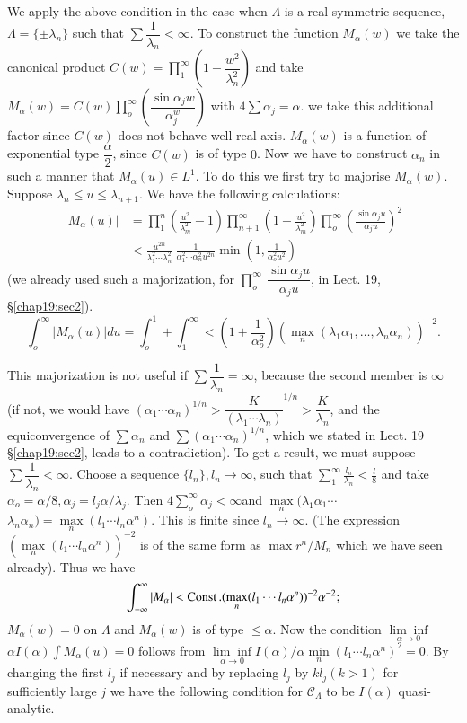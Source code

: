 We apply the above condition in the case when $\Lambda$ is a real
symmetric sequence, $\Lambda = \{ \pm \lambda_n\}$ such that $\sum
\dfrac{1}{\lambda_n} < \infty$. To construct the function $M_\alpha
(w)$ we take the canonical product $C(w) = \prod\limits_{1}^\infty
\left(1 
- \dfrac{w^2}{\lambda^2_n}\right)$ and take $M_\alpha (w) = C(w)
\prod\limits_{o}^\infty \left(\dfrac{\sin \alpha_j w}{\alpha_j^w}\right)$ with $4
\sum \alpha_j = \alpha$. we take this additional factor since $C(w)$
does not behave well real axis. $M_\alpha (w)$ is a function of
exponential type $\dfrac{\alpha}{2}$, since $C(w)$ is of type $0$. Now
we have to construct $\alpha_n$ in such a manner that $M_\alpha (u)
\in L^1$. To do this we first try to majorise $M_\alpha (w)$. Suppose
$\lambda_n \le u \le \lambda_{n+1}$. We have the following
calculations: 
\begin{align*}
 \big | M_\alpha (u) \big | & = \prod^n_1 \left(\frac{u^2}{\lambda^2_m}-1\right)
 \prod^\infty_{n+1} \left(1- \frac{u^2}{\lambda^2_m}\right) \prod^\infty_o
 \left(\frac{\sin \alpha_j u}{\alpha_j u}\right)^2\\ 
 & < \frac{u^{2n}}{\lambda^2_1 \cdots \lambda^2_n} ~
 \frac{1}{\alpha^2_1 \cdots \alpha^2_n u^{2n}} \min \left(1,
 \frac{1}{\alpha^2_o u^2}\right)
\end{align*}
(we already used such a majorization, for $\prod\limits^{\infty}_o ~
\dfrac{\sin \alpha_j u}{\alpha_j u}$, in Lect. 19, \S \ref{chap19:sec2}). 
$$
\int^\infty_o \big | M_\alpha (u) \big | du = \int^1_o + \int^\infty_1
<\left(1+ \frac{1}{\alpha^2_o}\right) (\max\limits_{n} (\lambda_1 \alpha_1, 
\ldots, \lambda_n \alpha_n ))^{-2}. 
$$

This majorization is not useful if $\sum \dfrac{1}{\lambda_n} =
\infty$, because the second member is $\infty$ (if not, we would have
$(\alpha_1 \cdots \alpha_n)^{1/n} > \dfrac{K}{(\lambda_1 \cdots
 \lambda_n)}^{1/n} > \dfrac{K}{\lambda_n}$, and the equiconvergence of $\sum
\alpha_n$ and $\sum (\alpha_1 \cdots \alpha_n)^{1/n}$, which we stated
in Lect. 19 \S \ref{chap19:sec2}, leads to a contradiction). To get a result, we
must suppose $\sum \dfrac{1}{\lambda_n} < \infty$. Choose a sequence
$\{l_n\}, l_n \to \infty$, such that $ \sum^\infty_1 \frac{l_n}{\lambda_n}
<\frac{l}{8}$ and take $\alpha_o = \alpha/8, \alpha_j = l_j
\alpha/\lambda_j$. Then $4 \sum^\infty_o \alpha_j < \infty$\pageoriginale and
$\max\limits_{n} (\lambda_1 \alpha_1 \cdots$ $\lambda_n \alpha_n) =
\max\limits_n (l_1 \cdots l_n \alpha^n)$. This is finite since $l_n
\to \infty$. (The expression $(\max\limits_n (l_1 \cdots l_n \alpha^n
))^{-2}$ is of the same form as $\max r^n/M_n$ which we have seen
already). Thus we have 
$$
\int^\infty_ {- \infty} | M_\alpha | < \operatorname{Const}. (\max_{n}(l_1
\cdots l_n \alpha^n))^{-2} \alpha^{-2}; 
$$
$M_\alpha (w) = 0$ on $\Lambda $ and $M_\alpha (w)$ is of type $\le
\alpha$. Now the condition $\underset{\alpha \to 0}{\lim \inf}$ $\alpha
I(\alpha) \int M_\alpha (u) = 0$ follows from $\underset{\alpha \to
 0}{\lim \inf} I (\alpha) / \alpha \min\limits_{n} (l_1 \cdots l_n
\alpha^n)^2 = 0$. By changing the first $l_j$ if necessary and by
replacing $l_j$ by $k l_j (k > 1)$ for sufficiently large $j$ we have
the following condition for $\mathscr{C}_\Lambda$ to be $I (\alpha)$
quasi-analytic. 

